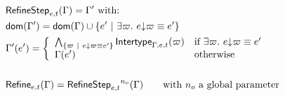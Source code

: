 \documentclass[a4paper]{article}
\theoremstyle{definition}
\begin{document}
    \begin{align*}
      &\textsf{RefineStep}_{e,t} (\Gamma) = \Gamma' \text{ with:}\\
      &\textsf{dom}(\Gamma')=\textsf{dom}(\Gamma) \cup \{e' ~|~ \exists \varpi.\ e{\downarrow}\varpi \equiv e'\}\\
      &\Gamma'(e') = 
        \left\{\begin{array}{ll}
          \bigwedge_{\{\varpi ~|~ e{\downarrow}\varpi \equiv e'\}}
          \textsf{Intertype}_{\Gamma,e,t} (\varpi) & \text{if } \exists \varpi.\ e{\downarrow}\varpi \equiv e' \\
          \Gamma(e') & \text{otherwise}
        \end{array}\right.\\&\\
      &\textsf{Refine}_{e,t}(\Gamma)={\textsf{RefineStep}_{e,t}}^{n_o}(\Gamma)\qquad\text{with $n_o$ a global parameter}
    \end{align*}
\end{document}
